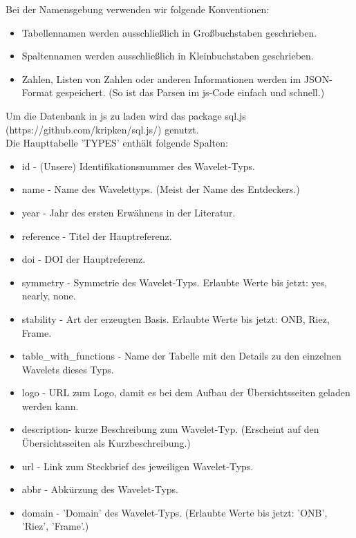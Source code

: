 \documentclass[11pt,a4paper,titlepage]{article}
\theoremstyle{plain} %
\theoremstyle{definition} %
\numberwithin{equation}{section} %
\begin{document}
	Bei der Namensgebung verwenden wir folgende Konventionen:
	\begin{itemize}
		\item Tabellennamen werden ausschließlich in Großbuchstaben geschrieben.
		\item Spaltennamen werden ausschließlich in Kleinbuchstaben geschrieben.
		\item Zahlen, Listen von Zahlen oder anderen Informationen werden im JSON-Format gespeichert. (So ist das Parsen im js-Code einfach und schnell.)
	\end{itemize}
	Um die Datenbank in js zu laden wird das package sql.js (https://github.com/kripken/sql.js/) genutzt.\\		
	Die Haupttabelle 'TYPES'  enthält folgende Spalten:
	\begin{itemize}
		\item id - (Unsere) Identifikationsnummer des Wavelet-Typs.
		\item name - Name des Wavelettyps. (Meist der Name des Entdeckers.)
		\item year - Jahr des ersten Erwähnens in der Literatur.
		\item reference - Titel der Hauptreferenz.
		\item doi - DOI der Hauptreferenz.
		\item symmetry - Symmetrie des Wavelet-Typs. Erlaubte Werte bis jetzt: yes, nearly, none.
		\item stability - Art der erzeugten Basis. Erlaubte Werte bis jetzt: ONB, Riez, Frame.
		\item table\_with\_functions - Name der Tabelle mit den Details zu den einzelnen Wavelets dieses Typs.
		\item logo - URL zum Logo, damit es bei dem Aufbau der Übersichtsseiten geladen werden kann.
		\item description- kurze Beschreibung zum Wavelet-Typ. (Erscheint auf den Übersichtsseiten als Kurzbeschreibung.)
		\item url - Link zum Steckbrief des jeweiligen Wavelet-Typs.
		\item abbr - Abkürzung des Wavelet-Typs.
		\item domain - 'Domain' des Wavelet-Typs. (Erlaubte Werte bis jetzt: 'ONB', 'Riez', 'Frame'.)\\
	\end{itemize}
	
\end{document}
